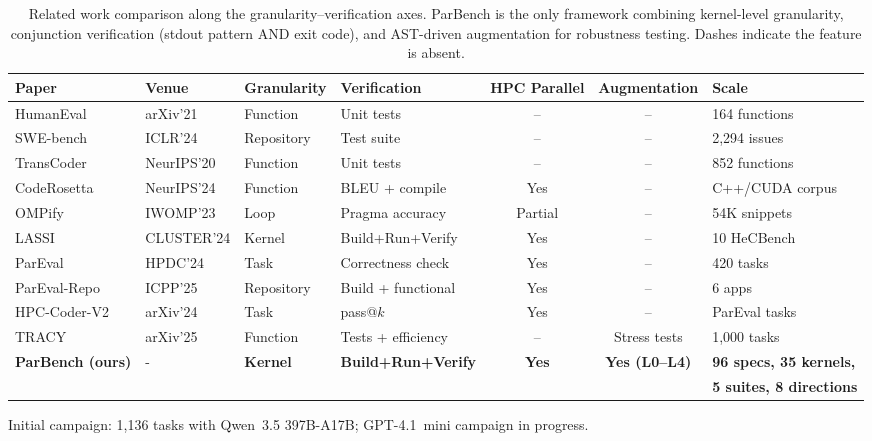 \documentclass[conference]{IEEEtran}
\begin{document}
\begin{table}[t]
\centering
\caption{Related work comparison along the granularity--verification axes. ParBench is the only framework combining kernel-level granularity, conjunction verification (stdout pattern AND exit code), and AST-driven augmentation for robustness testing. Dashes indicate the feature is absent.}
\label{tab:related-work}
\small
\begin{tabular}{@{}llllccl@{}}
\toprule
Paper & Venue & Granularity & Verification & HPC Parallel & Augmentation & Scale \\
\midrule
HumanEval~\cite{HumanEval2021} & arXiv'21 & Function & Unit tests & -- & -- & 164 functions \\
SWE-bench~\cite{SWEbench2024} & ICLR'24 & Repository & Test suite & -- & -- & 2,294 issues \\
TransCoder~\cite{TransCoder2020} & NeurIPS'20 & Function & Unit tests & -- & -- & 852 functions \\
CodeRosetta~\cite{CodeRosetta2024} & NeurIPS'24 & Function & BLEU + compile & Yes & -- & C++/CUDA corpus \\
OMPify~\cite{OMPify2023} & IWOMP'23 & Loop & Pragma accuracy & Partial & -- & 54K snippets \\
LASSI~\cite{LASSI2024} & CLUSTER'24 & Kernel & Build+Run+Verify & Yes & -- & 10 HeCBench \\
ParEval~\cite{ParEval2024} & HPDC'24 & Task & Correctness check & Yes & -- & 420 tasks \\
ParEval-Repo~\cite{ParEvalRepo2025} & ICPP'25 & Repository & Build + functional & Yes & -- & 6 apps \\
HPC-Coder-V2~\cite{HPCCoderV2} & arXiv'24 & Task & pass@$k$ & Yes & -- & ParEval tasks \\
TRACY~\cite{TRACY2025} & arXiv'25 & Function & Tests + efficiency & -- & Stress tests & 1,000 tasks \\
\textbf{ParBench (ours)} & - & \textbf{Kernel} & \textbf{Build+Run+Verify} & \textbf{Yes} & \textbf{Yes (L0--L4)} & \textbf{96 specs, 35 kernels, } \\
& & & & & & \textbf{5 suites, 8 directions} \\
\bottomrule
\end{tabular}
\par\vspace{2pt}
{\footnotesize Initial campaign: 1,136 tasks with Qwen~3.5 397B-A17B; GPT-4.1~mini campaign in progress.}
\end{table}
\end{document}
